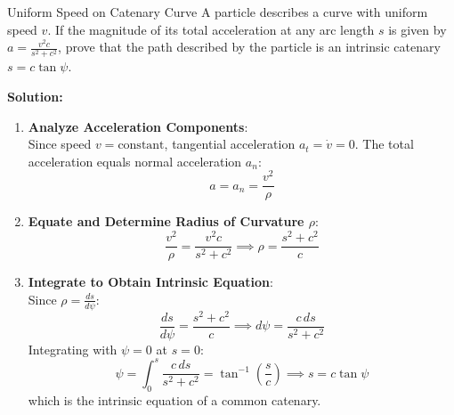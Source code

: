 \begin{examplebox}{Uniform Speed on Catenary Curve}
A particle describes a curve with uniform speed $v$. If the magnitude of its total acceleration at any arc length $s$ is given by $a = \frac{v^2 c}{s^2 + c^2}$, prove that the path described by the particle is an intrinsic catenary $s = c \tan\psi$.

\tcblower
\textbf{Solution:}

\begin{enumerate}[leftmargin=1.5em]
    \item \textbf{Analyze Acceleration Components}:\\
    Since speed $v = \text{constant}$, tangential acceleration $a_t = \dot{v} = 0$.
    The total acceleration equals normal acceleration $a_n$:
    \begin{equation*}
        a = a_n = \frac{v^2}{\rho}
    \end{equation*}

    \item \textbf{Equate and Determine Radius of Curvature $\rho$}:\\
    \begin{equation*}
        \frac{v^2}{\rho} = \frac{v^2 c}{s^2 + c^2} \implies \rho = \frac{s^2 + c^2}{c}
    \end{equation*}

    \item \textbf{Integrate to Obtain Intrinsic Equation}:\\
    Since $\rho = \frac{ds}{d\psi}$:
    \begin{equation*}
        \frac{ds}{d\psi} = \frac{s^2 + c^2}{c} \implies d\psi = \frac{c \, ds}{s^2 + c^2}
    \end{equation*}
    Integrating with $\psi = 0$ at $s = 0$:
    \begin{equation*}
        \psi = \int_0^s \frac{c \, ds}{s^2 + c^2} = \tan^{-1}\left(\frac{s}{c}\right) \implies s = c \tan\psi
    \end{equation*}
    which is the intrinsic equation of a common catenary.
\end{enumerate}
\end{examplebox}

